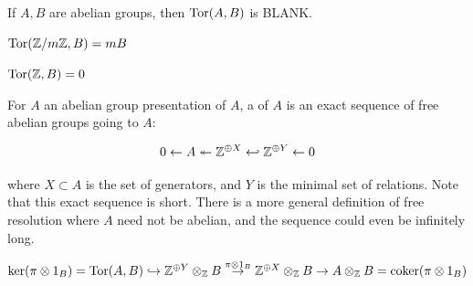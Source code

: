 \documentclass[11pt,leqno,oneside]{amsart}
\numberwithin{thm}{section}
\begin{document}
\begin{defn}
  If $A, B$ are abelian groups, then $\operatorname{Tor}(A, B)$ is BLANK.
\end{defn}
\begin{example}
  $\operatorname{Tor}({\mathbb Z}/m{\mathbb Z}, B) = mB$
\end{example}
\begin{example}
  $\operatorname{Tor}({\mathbb Z}, B) = 0$
\end{example}
\begin{defn}
  For $A$ an abelian group presentation of $A$, a  of $A$ is an exact sequence of free abelian groups going to $A$:

  $$0 \leftarrow A \twoheadleftarrow {\mathbb Z}^{\oplus X} \hookleftarrow {\mathbb Z}^{\oplus Y} \leftarrow 0$$

  where $X \subset A$ is the set of generators, and $Y$ is the minimal set of relations.  Note that this exact sequence is short.  There is a more general definition of free resolution where $A$ need not be abelian, and the sequence could even be infinitely long.
\end{defn}

\begin{defn}
  $\ker(\pi \otimes 1_B) = \operatorname{Tor}(A, B) \hookrightarrow {\mathbb Z}^{\oplus Y} \otimes_{\mathbb Z} B \overset{\pi \otimes 1_B}{\to} {\mathbb Z}^{\oplus X} \otimes_{\mathbb Z} B \to A \otimes_{\mathbb Z} B = \operatorname{coker}(\pi \otimes 1_B)$
\end{defn}
\end{document}
